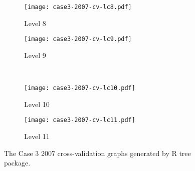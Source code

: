 \begin{appendices}
\begin{figure}[!ht]
\begin{subfigure}[t]{0.32\textwidth}
		\texttt{[image: case3-2007-cv-lc8.pdf]}
		\caption{Level 8}
	\end{subfigure}
	\begin{subfigure}[t]{0.32\textwidth}
		\texttt{[image: case3-2007-cv-lc9.pdf]}
		\caption{Level 9}
	\end{subfigure}\\
	\vspace{5pt}
	\begin{subfigure}[t]{0.32\textwidth}
		\texttt{[image: case3-2007-cv-lc10.pdf]}
		\caption{Level 10}
	\end{subfigure}
	\begin{subfigure}[t]{0.32\textwidth}
		\texttt{[image: case3-2007-cv-lc11.pdf]}
		\caption{Level 11}
	\end{subfigure}
	\vspace{5pt}
	\caption[The Case 3 2007 cross-validation graphs generated by R tree package.]{The Case 3 2007 cross-validation graphs generated by R tree package.}
	\label{fig: appendix-fig.c18.cv}
\end{figure}



\end{appendices}
